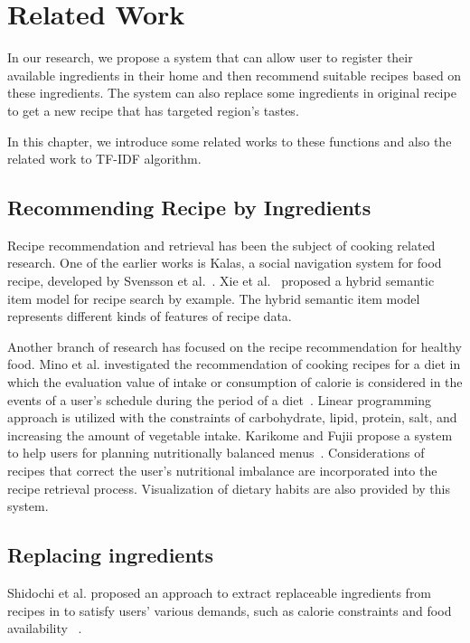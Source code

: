 \chapter{Related Work}\label{chap:related}

In our research, we propose a system that can allow user to register their available ingredients in their home and then recommend suitable recipes based on these ingredients. The system can also replace some ingredients in original recipe to get a new recipe that has targeted region's tastes. 

In this chapter, we introduce some related works to these functions and also the related work to TF-IDF algorithm. 

\clearpage

\section{Recommending Recipe by Ingredients}\label{sec:related_near}


Recipe recommendation and retrieval has been the subject of
cooking related research. One of the earlier works is Kalas, a social navigation system for food recipe, developed by Svensson et al.~\cite{Svensson:2005:DEK:1096737.1096739}. Xie et al.~\cite{5693849} proposed a hybrid semantic item model for recipe search by example. The hybrid semantic item model represents different kinds of features of recipe data. 


Another branch of research has focused on the recipe
recommendation for healthy food. Mino et al. investigated the recommendation of cooking recipes for a diet in which the evaluation value of intake or consumption of calorie is considered in the events of a user's schedule during the period of a diet~\cite{5358168}. Linear programming approach is utilized with the constraints of carbohydrate, lipid, protein, salt, and increasing the amount of vegetable intake. Karikome and Fujii propose a system to help users for planning nutritionally balanced menus~\cite{Karikome:2010:SSD:2108616.2108684}. Considerations of recipes that correct the user’s nutritional imbalance are incorporated into
the recipe retrieval process.
Visualization of dietary habits are also provided by this system.


\section{Replacing ingredients}

Shidochi et al. proposed an approach to extract replaceable
ingredients from recipes in to satisfy users' various demands, such as calorie constraints and food availability ~\cite{Shidochi:2009:FRM:1630995.1630998}. 


